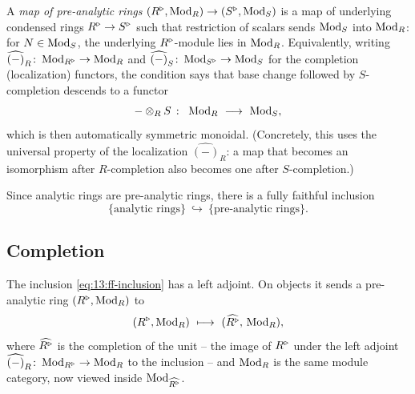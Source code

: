 \begin{definition}[Maps]
\label{def:13:maps}
A \emph{map of pre-analytic rings} $(R^{\triangleright},\operatorname{Mod}_R)\to(S^{\triangleright},\operatorname{Mod}_S)$ is a map of
underlying condensed rings $R^{\triangleright}\to S^{\triangleright}$ such that restriction of scalars sends
$\operatorname{Mod}_S$ into $\operatorname{Mod}_R$: for $N\in\operatorname{Mod}_S$, the underlying $R^{\triangleright}$-module lies in
$\operatorname{Mod}_R$. Equivalently, writing $\widehat{(-)}_R\colon\operatorname{Mod}_{R^{\triangleright}}\to\operatorname{Mod}_R$ and
$\widehat{(-)}_S\colon\operatorname{Mod}_{S^{\triangleright}}\to\operatorname{Mod}_S$ for the completion (localization)
functors, the condition says that base change followed by $S$-completion
descends to a functor
\begin{equation*}
-\otimes_R S\ \colon\ \Mod_R\ \longrightarrow\ \Mod_S,
\end{equation*}
which is then automatically symmetric monoidal. (Concretely, this uses the
universal property of the localization $\widehat{(-)}_R$: a map that becomes an
isomorphism after $R$-completion also becomes one after $S$-completion.)
\end{definition}

Since analytic rings are pre-analytic rings, there is a fully faithful inclusion
\begin{equation}
\label{eq:13:ff-inclusion}
\{\text{analytic rings}\}\ \hookrightarrow\ \{\text{pre-analytic rings}\}.
\end{equation}

\subsection{Completion}

\begin{proposition}
\label{prop:13:completion}
The inclusion \eqref{eq:13:ff-inclusion} has a left adjoint. On objects it sends
a pre-analytic ring $(R^{\triangleright}, \operatorname{Mod}_R)$ to
\begin{equation*}
(R^{\triangleright}, \operatorname{Mod}_R)\ \longmapsto\ (\widehat{R^{\triangleright}},\, \operatorname{Mod}_R),
\end{equation*}
where $\widehat{R^{\triangleright}}$ is the completion of the unit -- the image of $R^{\triangleright}$
under the left adjoint $\widehat{(-)}_R\colon\operatorname{Mod}_{R^{\triangleright}}\to\operatorname{Mod}_R$ to the
inclusion -- and $\operatorname{Mod}_R$ is the same module category, now viewed inside
$\operatorname{Mod}_{\widehat{R^{\triangleright}}}$.
\end{proposition}

